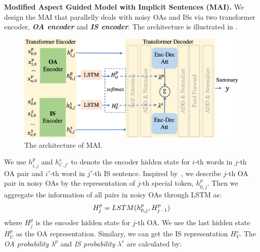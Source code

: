 {{\textbf{Modified Aspect Guided Model with Implicit Sentences (MAI).}
We design the MAI that parallelly deals with noisy OAs and ISs
via two transformer encoder, \textbf{\em OA encoder} and \textbf{\em IS encoder}. 
The architecture is illustrated in .

\begin{figure}[th]
	\centering
	\includegraphics[width=1\linewidth]{./model.pdf}
	\caption{The architecture of MAI.}
	\label{fig:model}
\end{figure}
We use $h^p_{i,j}$ and $h^s_{i',j'}$ to denote the encoder hidden state for $i$-th words in $j$-th OA pair
and $i'$-th word in $j'$-th IS sentence.
Inspired by~\citet{DialogMV2020},
we describe $j$-th OA pair in noisy OAs by 
the representation of $j$-th special token, $h^p_{0,j}$.
Then we aggregate the information of all pairs in noisy OAs through LSTM 
as:
\begin{equation}
	\small
	H^p_j = LSTM(h^p_{0,j}, H^p_{j-1})
\end{equation}
where $H^p_j$ is the encoder hidden state for $j$-th OA.
We use the last hidden state $H^p_U$ as the OA representation.
Similary, we can get the IS representation $H^s_V$.
The {\em OA probability} $\lambda^p$ and 
{\em IS probability} $\lambda^s$ are calculated by:
\begin{equation}

\end{equation}}}
